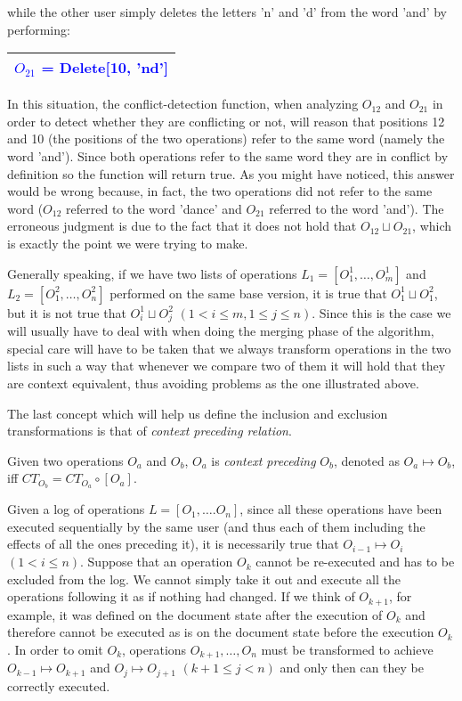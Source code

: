 while the other user simply deletes the letters 'n' and 'd' from the word 'and' by
performing:

\begin{center}
\begin{tabular}[c]{|c|}
\hline
\textcolor{blue}{$O_{21}$ = Delete[10, 'nd']}\\
\hline
\end{tabular}
\end{center}

In this situation, the conflict-detection function, when analyzing $O_{12}$ and $O_{21}$ in order
to detect whether they are conflicting or not, will reason that positions 12 and 10 (the
positions of the two operations) refer to the same word (namely the word 'and'). Since
both operations refer to the same word they are in conflict by definition so the function
will return true. As you might have noticed, this answer would be wrong because, in fact,
the two operations did not refer to the same word ($O_{12}$ referred to the word 'dance'
and $O_{21}$ referred to the word 'and'). The erroneous judgment is due to the fact that
it does not hold that $O_{12} \sqcup O_{21}$, which is exactly the point we were trying
to make.

Generally speaking, if we have two lists of operations $L_{1}=[O_{1}^{1},\ldots,O_{m}^{1}]$
and $L_{2}=[O_{1}^{2},\ldots,O_{n}^{2}]$ performed on the same base version, it is true
that $O_{1}^{1} \sqcup O_{1}^{2}$, but it is not true that $O_{i}^{1} \sqcup O_{j}^{2}$ 
$(1 < i \le m,1 \le j \le n)$. Since this is the case we will usually have to deal with
when doing the merging phase of the algorithm, special care will have to be taken that
we always transform operations in the two lists in such a way that whenever we compare
two of them it will hold that they are context equivalent, thus avoiding problems as
the one illustrated above.

The last concept which will help us define the inclusion and exclusion transformations
is that of \emph{context preceding relation}.

\begin{defi}
\label{def:cprec}
Given two operations $O_{a}$ and $O_{b}$, $O_{a}$ is \emph{context preceding} $O_{b}$,
denoted as $O_{a} \mapsto O_{b}$, iff $CT_{O_{b}}=CT_{O_{a}} \circ [O_{a}]$.
\end{defi}

Given a log of operations $L=[O_{1},\ldots.O_{n}]$, since all these operations have been
executed sequentially by the same user (and thus each of them including the effects of all
the ones preceding it), it is necessarily true that $O_{i-1} \mapsto O_{i}$ $(1 < i \le n)$.
Suppose that an operation $O_{k}$ cannot be re-executed and has to be excluded from the
log. We cannot simply take it out and execute all the operations following it as if nothing
had changed. If we think of $O_{k+1}$, for example, it was defined on the document state
after the execution of $O_{k}$ and therefore cannot be executed as is on the document state
before the execution $O_{k}$. In order to omit $O_{k}$, operations $O_{k+1},\ldots,
O_{n}$ must be transformed to achieve $O_{k-1} \mapsto O_{k+1}$ and $O_{j} \mapsto O_{j+1}$
$(k+1 \le j < n)$ and only then can they be correctly executed.

